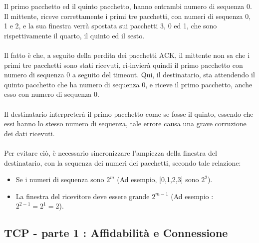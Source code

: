 \documentclass[12pt, letterpaper]{article}
\newcommand{\acc}{\\\hphantom{}\\}
\begin{document}
Il primo pacchetto ed il quinto pacchetto, hanno entrambi numero di sequenza 0. Il mittente, riceve correttamente
i primi tre pacchetti, con numeri di sequenza 0, 1 e 2, e la sua finestra verrà spostata sui pacchetti
3, 0 ed 1, che sono rispettivamente il quarto, il quinto ed il sesto.\acc
Il fatto è che, a seguito della perdita dei pacchetti ACK, il mittente non sa che i primi tre pacchetti sono stati
ricevuti, ri-invierà quindi il primo pacchetto con numero di sequenza 0 a seguito del timeout. Qui, il destinatario,
sta attendendo il quinto pacchetto che ha numero di sequenza 0, e riceve il primo pacchetto, anche esso con numero di
sequenza 0.\acc
Il destinatario interpreterà il primo pacchetto come se fosse il quinto, essendo che essi hanno lo stesso numero di
sequenza, tale errore causa una grave corruzione dei dati ricevuti.\acc
Per evitare ciò, è necessario sincronizzare l'ampiezza della finestra del destinatario, con la sequenza dei
numeri dei pacchetti, secondo tale relazione: \begin{itemize}
    \item Se i numeri di sequenza sono $2^m$ (Ad esempio, [0,1,2,3] sono $2^2$).
    \item La finestra del ricevitore deve essere grande $2^{m-1}$ (Ad esempio : $2^{2-1}=2^1=2$).
\end{itemize}
\subsection{TCP - parte 1 : Affidabilità e Connessione}
\end{document}
